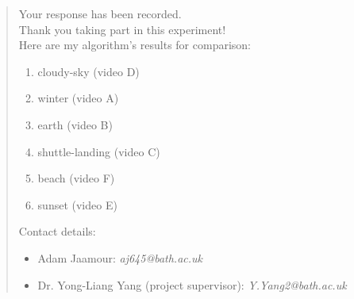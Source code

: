 \begin{quote}
    Your response has been recorded.\\

    Thank you taking part in this experiment!\\
    
    Here are my algorithm's results for comparison: 
    \begin{enumerate}
        \item cloudy-sky (video D)
        \item winter (video A)
        \item earth (video B)
        \item shuttle-landing (video C)
        \item beach (video F)
        \item sunset (video E)
    \end{enumerate}
    
    Contact details:
    \begin{itemize}
        \item Adam Jaamour: \textit{aj645@bath.ac.uk}
        \item Dr. Yong-Liang Yang (project supervisor): \textit{Y.Yang2@bath.ac.uk}
    \end{itemize}
\end{quote}